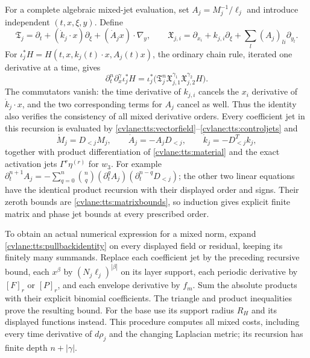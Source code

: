 For a complete algebraic mixed-jet evaluation, set
$A_j=M_j^{-1}/\ell_j$ and introduce independent
$(t,x,\xi,y)$. Define
\begin{equation}\label{cvlane:tts:pullbackops}
 \mathfrak T_j=\partial_t+(\dot k_j\cdot x)\partial_\xi
                                  +(\dot A_jx)\cdot\nabla_y,
 \qquad
 \mathfrak X_{j,i}=\partial_{x_i}+k_{j,i}\partial_\xi
                                +\sum_l(A_j)_{li}\partial_{y_l}.
\end{equation}
For $\iota_j^*H=H(t,x,k_j(t)\cdot x,A_j(t)x)$, the ordinary
chain rule, iterated one derivative at a time, gives
\begin{equation}\label{cvlane:tts:pullbackidentity}
 \partial_t^n\partial_x^\gamma\iota_j^*H
 =\iota_j^*\bigl(\mathfrak T_j^n
        \mathfrak X_{j,1}^{\gamma_1}\mathfrak X_{j,2}^{\gamma_2}H\bigr).
\end{equation}
The commutators vanish: the time derivative of $k_{j,i}$
cancels the $x_i$ derivative of $\dot k_j\cdot x$, and
the two corresponding terms for $A_j$ cancel as well. Thus the
identity also verifies the consistency of all mixed derivative orders.
Every coefficient jet in this recursion is evaluated by
\eqref{cvlane:tts:vectorfield}--\eqref{cvlane:tts:controljets} and
\[
 \dot M_j=D_{<j}M_j,\qquad
 \dot A_j=-A_jD_{<j},\qquad
 \dot k_j=-D_{<j}^Tk_j,
\]
together with product differentiation of \eqref{cvlane:tts:material}
and the exact activation jets $\Gamma^r\eta^{(r)}$ for $w_3$.
For example
$\partial_t^{n+1}A_j=-\sum_{q=0}^n\binom nq
(\partial_t^qA_j)(\partial_t^{n-q}D_{<j})$;
the other two linear equations have the identical product recursion
with their displayed order and signs. Their zeroth bounds are
\eqref{cvlane:tts:matrixbounds}, so induction gives explicit finite
matrix and phase jet bounds at every prescribed order.

To obtain an actual numerical expression for a mixed norm, expand
\eqref{cvlane:tts:pullbackidentity} on every displayed field or residual,
keeping its finitely many summands. Replace each coefficient jet by
the preceding recursive bound, each $x^\beta$ by
$(N_j\ell_j)^{|\beta|}$ on its layer support, each periodic
derivative by $[F]_r$ or $[P]_r$, and each envelope derivative by
$f_m$. Sum the absolute products with their explicit binomial
coefficients. The triangle and product inequalities prove the
resulting bound. For the base use its support radius $R_H$ and
its displayed functions instead. This procedure computes all mixed
costs, including every time derivative of $d\rho_j$ and the changing
Laplacian metric; its recursion has finite depth $n+|\gamma|$.

